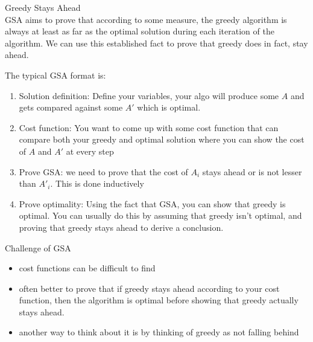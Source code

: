 \documentclass[journal, letterpaper]{IEEEtran}
\begin{document}
\begin{theory}{Greedy Stays Ahead}\\
    GSA aims to prove that according to some measure, the greedy algorithm is always at
    least as far as the optimal solution during each iteration of the algorithm. We can
    use this established fact to prove that greedy does in fact, stay ahead.

    The typical GSA format is:
    \begin{enumerate}
        \item Solution definition: Define your variables, your algo will produce some $A$
            and gets compared against some $A'$ which is optimal.
        \item Cost function: You want to come up with some cost function that can compare
            both your greedy and optimal solution where you can show the cost of $A$ and
            $A'$ at every step 
        \item Prove GSA: we need to prove that the cost of $A_i$ stays ahead or is not
            lesser than $A'_i$. This is done inductively
        \item Prove optimality: Using the fact that GSA, you can show that greedy is
            optimal. You can usually do this by assuming that greedy isn't optimal, and
            proving that greedy stays ahead to derive a conclusion.
    \end{enumerate}
\end{theory}
\begin{aside}{Challenge of GSA}\\
    \begin{itemize}
        \item cost functions can be difficult to find
        \item often better to prove that if greedy stays ahead according to your cost function, 
            then the algorithm is optimal before showing that greedy actually stays ahead.
        \item another way to think about it is by thinking of greedy as not falling behind
    \end{itemize}
\end{aside}
\end{document}
